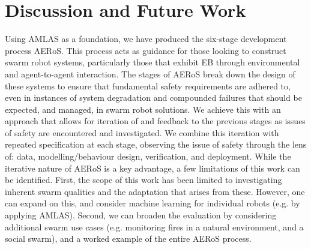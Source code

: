 \documentclass[runningheads]{llncs}
\begin{document}
\newpage
\section{Discussion and Future Work} \label{discussion-conclusions}

Using AMLAS \cite{Hawkins2021} as a foundation, we have produced the six-stage development process AERoS. This process acts as guidance for those looking to construct swarm robot systems, particularly those that exhibit EB through environmental and agent-to-agent interaction. The stages of AERoS break down the design of these systems to ensure that fundamental safety requirements are adhered to, even in instances of system degradation and compounded failures that should be expected, and managed, in swarm robot solutions. We achieve this with an approach that allows for iteration of and feedback to the previous stages as issues of safety are encountered and investigated. We combine this iteration with repeated specification at each stage, observing the issue of safety through the lens of: data, modelling/behaviour design, verification, and deployment. 
While the iterative nature of AERoS is a key advantage, a few limitations of this work can be identified. 
First, the scope of this work has been limited to investigating inherent swarm qualities and the adaptation that arises from these. 
However, one can expand on this, and consider machine learning for individual robots (e.g. by applying AMLAS). 
Second, we can broaden the evaluation by considering additional swarm use cases (e.g. monitoring fires in a natural environment, and a social swarm), and a worked example of the entire AERoS process.


\end{document}
